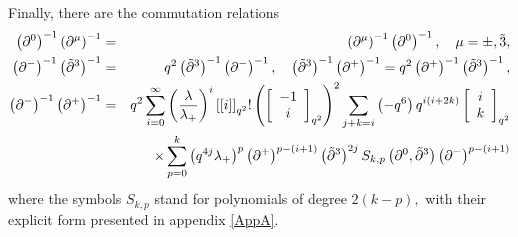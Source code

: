 \documentclass[a4paper,11pt,oneside]{article}
\begin{document}
Finally, there are the commutation relations 
\begin{eqnarray}
\left( \partial ^{0}\right) ^{-1}\left( \partial ^{\mu}\right) ^{-1} &=&\left(
\partial ^{\mu}\right) ^{-1}\left( \partial ^{0}\right) ^{-1},\quad \mu=\pm ,%
\tilde{3}, \\
\left( \partial ^{-}\right) ^{-1}\left( \tilde{\partial}^{3}\right) ^{-1}
&=&q^{2}\left( \tilde{\partial}^{3}\right) ^{-1}\left( \partial ^{-}\right)
^{-1},\quad \left( \tilde{\partial}^{3}\right) ^{-1}\left( \partial
^{+}\right) ^{-1}=q^{2}\left( \partial ^{+}\right) ^{-1}\left( \tilde{%
\partial}^{3}\right) ^{-1},  \nonumber \\
\left( \partial ^{-}\right) ^{-1}\left( \partial ^{+}\right) ^{-1}
&=&q^{2}\sum_{i=0}^{\infty }\left( \frac{\lambda}{\lambda _{+}}\right)
^{i}\left[ \left[ i\right] \right] _{q^{2}}!\left(
  \left[\begin{array}{c} -1\\i\end{array}\right]_{q^{2}}\right) ^{2}\sum_{j+k=i}\left( -q^{6}\right) q^{i\left( i+2k\right) }%
\left[ \begin{array}{c} i\\k\end{array}\right]_{q^{2}}  \nonumber \\
&&\times \sum_{p=0}^{k}\left( q^{4j}\lambda _{+}\right) ^{p}\left( \partial
^{+}\right) ^{p-\left( i+1\right) }\left( \tilde{\partial}^{3}\right)
^{2j}S_{k,p}\left( \partial ^{0},\tilde{\partial}^{3}\right) \left( \partial
^{-}\right) ^{p-\left( i+1\right) }  \nonumber
\end{eqnarray}
where the symbols $S_{k,p}$ stand for polynomials of degree $2(k-p),$ with
their explicit form presented in appendix \ref{AppA}.
\end{document}
